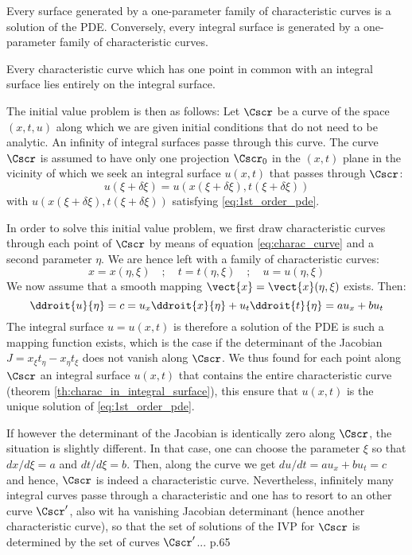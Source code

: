\begin{theorem}
  Every surface generated by a one-parameter family of characteristic curves is a solution of the PDE. Conversely, every integral surface is generated by a one-parameter family of characteristic curves.
\end{theorem}
\begin{theorem}
  \label{th:charac_in_integral_surface}
  Every characteristic curve which has one point in common with an integral surface lies entirely on the integral surface.
\end{theorem}
The initial value problem is then as follows: Let $\Cscr$ be a curve of the space $(x,t,u)$ along which we are given initial conditions that do not need to be analytic. An infinity of integral surfaces passe through this curve. The curve $\Cscr$ is assumed to have only one projection $\Cscr_0$ in the $(x,t)$ plane in the vicinity of which we seek an integral surface $u(x,t)$ that passes through $\Cscr$:
\begin{equation}
  \label{eq:IVP_char}
  u(\xi + \delta\xi) = u(x(\xi + \delta\xi),t(\xi + \delta\xi))
\end{equation}
with $u(x(\xi + \delta\xi),t(\xi + \delta\xi))$ satisfying \eqref{eq:1st_order_pde}.

In order to solve this initial value problem, we first draw characteristic curves through each point of $\Cscr$ by means of equation \eqref{eq:charac_curve} and a second parameter $\eta$. We are hence left with a family of characteristic curves:
\begin{equation}
  \label{eq:2}
  x=x(\eta,\xi) \quad ; \quad t=t(\eta,\xi)\quad ;\quad u=u(\eta,\xi)
\end{equation}
We now assume that a smooth mapping $\vect{x}=\vect{x}(\eta,\xi)$ exists. Then:
\begin{equation}
  \label{eq:3}
  \ddroit{u}{\eta} = c = u_x \ddroit{x}{\eta} + u_t \ddroit{t}{\eta} =  a u_x + b u_t
\end{equation}
The integral surface $u=u(x,t)$ is therefore a solution of the PDE is such a mapping function exists, which is the case if the determinant of the Jacobian $J=x_\xi t_\eta - x_\eta t_\xi $ does not vanish along $\Cscr$. We thus found for each point along $\Cscr$ an integral surface $u(x,t)$ that contains the entire characteristic curve (theorem \ref{th:charac_in_integral_surface}), this ensure that $u(x,t)$ is the unique solution of \eqref{eq:1st_order_pde}.

If however the determinant of the Jacobian is identically zero along $\Cscr$, the situation is slightly different. In that case, one can choose the parameter $\xi$ so that $dx/d\xi=a$ and $dt/d\xi = b$. Then, along the curve we get $du/dt = a u_x + b u_t = c$ and hence, $\Cscr$ is indeed a characteristic curve. Nevertheless, infinitely many integral curves passe through a characteristic and one has to resort to an other curve $\Cscr'$, also wit ha vanishing Jacobian determinant (hence another characteristic curve), so that the set of solutions of the IVP for $\Cscr$ is determined by the set of curves $\Cscr'$... p.65 


